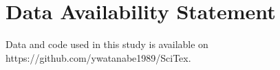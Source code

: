 
\section*{Data Availability Statement}
Data and code used in this study is available on https://github.com/ywatanabe1989/SciTex.
\label{data and code availability}

